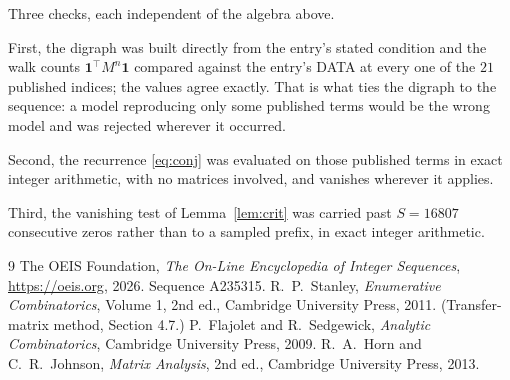 \documentclass[11pt,a4paper]{article}
\theoremstyle{plain}
\theoremstyle{definition}
\begin{document}
Three checks, each independent of the algebra above.

First, the digraph was built directly from the entry's stated condition and the walk counts
$\mathbf{1}^{\!\top}M^{n}\mathbf{1}$ compared against the entry's DATA at every one of
the $21$ published indices; the values agree exactly. That is what ties the digraph to
the sequence: a model reproducing only some published terms would be the wrong model and
was rejected wherever it occurred.

Second, the recurrence \eqref{eq:conj} was evaluated on those published terms in exact
integer arithmetic, with no matrices involved, and vanishes wherever it applies.

Third, the vanishing test of Lemma~\ref{lem:crit} was carried past $S=16807$ consecutive
zeros rather than to a sampled prefix, in exact integer arithmetic.

\begin{thebibliography}{9}
 The OEIS Foundation, \emph{The On-Line Encyclopedia of Integer
Sequences}, \url{https://oeis.org}, 2026. Sequence A235315.
 R.~P.~Stanley, \emph{Enumerative Combinatorics}, Volume 1, 2nd ed.,
Cambridge University Press, 2011. (Transfer-matrix method, Section 4.7.)
 P.~Flajolet and R.~Sedgewick, \emph{Analytic Combinatorics}, Cambridge
University Press, 2009.
 R.~A.~Horn and C.~R.~Johnson, \emph{Matrix Analysis}, 2nd ed., Cambridge
University Press, 2013.
\end{thebibliography}
\end{document}
